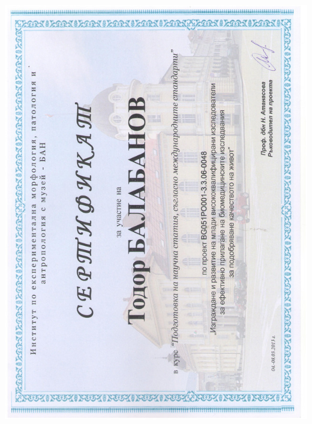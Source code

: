 \documentclass[english,a4paper]{europasscv}
\begin{document}
\includegraphics[width=\textwidth,height=\textheight,keepaspectratio]{IEMPAM2013_4}
\end{document}
